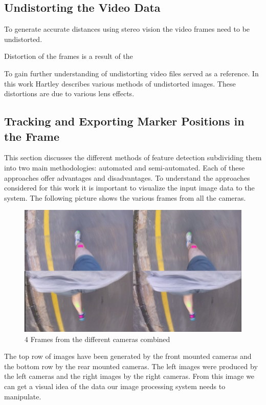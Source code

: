 \subsection{Undistorting the Video Data}
To generate accurate distances using stereo vision the video frames need to be undistorted.

Distortion of the frames is a result of the 

To gain further understanding of undistorting video files \cite{Hartley2004} served as a reference. In this work Hartley describes various methods of undistorted images. These distortions are due to various lens effects.

\subsection{Tracking and Exporting Marker Positions in the Frame}

This section discusses the different methods of feature detection subdividing them into two main methodologies: automated and semi-automated. Each of these approaches offer advantages and disadvantages. To understand the approaches considered for this work it is important to visualize the input image data to the system. The following picture shows the various frames from all the cameras.

\begin{figure}[!ht]
\captionsetup{width=0.8\linewidth, font=small} 
\includegraphics[width=\linewidth]{figures/pat_run_quad.png}
\caption{4 Frames from the different cameras combined}
\label{fig:pat_run_quad}
\end{figure}

The top row of images have been generated by the front mounted cameras and the bottom row by the rear mounted cameras. The left images were produced by the left cameras and the right images by the right cameras. From this image we can get a visual idea of the data our image processing system needs to manipulate.

